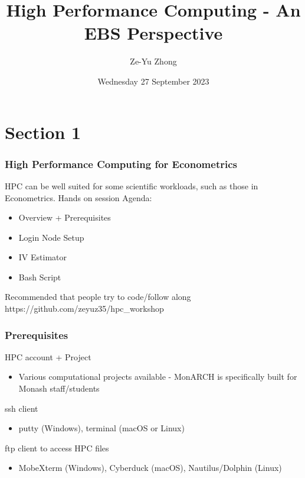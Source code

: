\documentclass[aspectratio=169,notheorems]{beamer}
\title{High Performance Computing - An EBS Perspective}
\author[]{Ze-Yu Zhong
}
\date{Wednesday 27 September 2023}
\theoremstyle{plain}
\theoremstyle{plain}
\numberwithin{equation}{section}
\begin{document}
\begin{frame}
\titlepage
\end{frame}

\section{Section 1}
\begin{frame}
\frametitle{High Performance Computing for Econometrics}
HPC can be well suited for some scientific workloads, such as those in Econometrics.
\medskip
Hands on session Agenda:
\begin{itemize}
\item Overview + Prerequisites
\item Login Node Setup
\item IV Estimator
\item Bash Script
\end{itemize}
Recommended that people try to code/follow along
\medskip
https://github.com/zeyuz35/hpc\_workshop
\end{frame}

\begin{frame}
\frametitle{Prerequisites}
HPC account + Project
\begin{itemize}
\item Various computational projects available - MonARCH is specifically built for Monash staff/students
\end{itemize}
ssh client
\begin{itemize}
\item putty (Windows), terminal (macOS or Linux)
\end{itemize}
ftp client to access HPC files
\begin{itemize}
\item MobeXterm (Windows), Cyberduck (macOS), Nautilus/Dolphin (Linux)
\end{itemize}
\end{frame}
\end{document}
